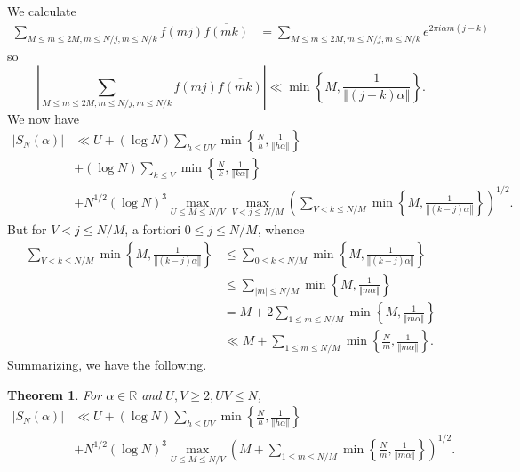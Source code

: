 \documentclass{article}
\newcommand{\norm}[1]{\left\Vert #1 \right\Vert}
\newtheorem{theorem}{Theorem}
\theoremstyle{definition}
\begin{document}
We calculate
\begin{align*}
\sum_{M \leq m \leq 2M, m \leq N/j, m \leq N/k}  f(mj) \overline{f(mk)}&=\sum_{M \leq m \leq 2M, m \leq N/j, m \leq N/k} e^{2\pi i \alpha m(j-k)}
\end{align*}
so
\[
\left| \sum_{M \leq m \leq 2M, m \leq N/j, m \leq N/k}  f(mj) \overline{f(mk)} \right| \ll \min\left\{M, \frac{1}{\norm{(j-k)\alpha}}\right\}. 
\]
We now have
\begin{align*}
|S_N(\alpha)|&\ll U + (\log N) \sum_{h \leq UV} \min\left\{\frac{N}{h}, \frac{1}{\norm{h\alpha}}\right\}\\
&+(\log N) \sum_{k \leq V} \min\left\{\frac{N}{k}, \frac{1}{\norm{k\alpha}}\right\}\\
&+N^{1/2} (\log N)^3 \max_{U \leq M \leq N/V} \max_{V<j\leq N/M}\left(  \sum_{V<k \leq N/M}  \min\left\{M, \frac{1}{\norm{(k-j)\alpha}}\right\}\right)^{1/2}.
\end{align*}
But for $V<j \leq N/M$, a fortiori $0 \leq j \leq N/M$, whence
\begin{align*}
 \sum_{V<k \leq N/M}  \min\left\{M, \frac{1}{\norm{(k-j)\alpha}}\right\} &\leq
  \sum_{0 \leq k \leq N/M}  \min\left\{M, \frac{1}{\norm{(k-j)\alpha}}\right\} \\
&\leq \sum_{|m| \leq N/M} \min\left\{M, \frac{1}{\norm{m\alpha}} \right\}\\
&=M + 2 \sum_{1 \leq m \leq N/M}  \min\left\{M, \frac{1}{\norm{m\alpha}} \right\}\\
&\ll M +  \sum_{1 \leq m \leq N/M} \min\left\{\frac{N}{m}, \frac{1}{\norm{m\alpha}} \right\}.
\end{align*}
Summarizing, we have the following.

\begin{theorem}
For $\alpha \in \mathbb{R}$ and $U,V \geq 2, UV \leq N$,
\begin{align*}
|S_N(\alpha)|&\ll U + (\log N) \sum_{h \leq UV} \min\left\{\frac{N}{h}, \frac{1}{\norm{h\alpha}}\right\}\\
&+N^{1/2} (\log N)^3 \max_{U \leq M \leq N/V} \left( M +  \sum_{1 \leq m \leq N/M} \min\left\{\frac{N}{m}, \frac{1}{\norm{m\alpha}} \right\}  \right)^{1/2}.
\end{align*}
\label{SN}
\end{theorem}
\end{document}
